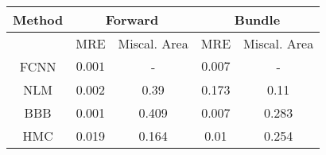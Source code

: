 \documentclass[convert={outext=.png}]{standalone}
\begin{document}
\centering
\label{tab:experimental_results}



\begin{tabular}{c c c c c}
\hline
\hline
Method &  \multicolumn{2}{c}{Forward} & \multicolumn{2}{c}{Bundle} \\ \hline
 & MRE & Miscal. Area & MRE & Miscal. Area\\
 FCNN & $\mathbf{0.001}$ & - & $\mathbf{0.007}$ & - \\
 \hline
 NLM & 0.002 & 0.39 & 0.173 & 0.11 \\
 BBB & 0.001 & 0.409 & 0.007 & 0.283 \\
 HMC & 0.019 & 0.164 & 0.01 & 0.254 \\
\hline
\hline
\end{tabular}
\end{document}
